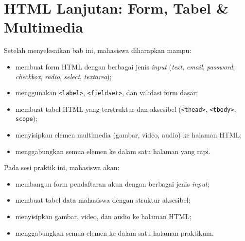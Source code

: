 
\chapter{HTML Lanjutan: Form, Tabel \& Multimedia}
\label{chap:minggu-04}

\begin{capaian}
Setelah menyelesaikan bab ini, mahasiswa diharapkan mampu:
\begin{itemize}
  \item membuat form HTML dengan berbagai jenis \emph{input} (\emph{text}, \emph{email}, \emph{password}, \emph{checkbox}, \emph{radio}, \emph{select}, \emph{textarea});
  \item menggunakan \texttt{<label>}, \texttt{<fieldset>}, dan validasi form dasar;
  \item membuat tabel HTML yang terstruktur dan aksesibel (\texttt{<thead>}, \texttt{<tbody>}, \texttt{scope});
  \item menyisipkan elemen multimedia (gambar, video, audio) ke halaman HTML;
  \item menggabungkan semua elemen ke dalam satu halaman yang rapi.
\end{itemize}
\end{capaian}

\begin{tujuanpraktik}
Pada sesi praktik ini, mahasiswa akan:
\begin{itemize}
  \item membangun form pendaftaran akun dengan berbagai jenis \emph{input};
  \item membuat tabel data mahasiswa dengan struktur aksesibel;
  \item menyisipkan gambar, video, dan audio ke halaman HTML;
  \item menggabungkan semua elemen ke dalam satu halaman praktikum.
\end{itemize}
\end{tujuanpraktik}


